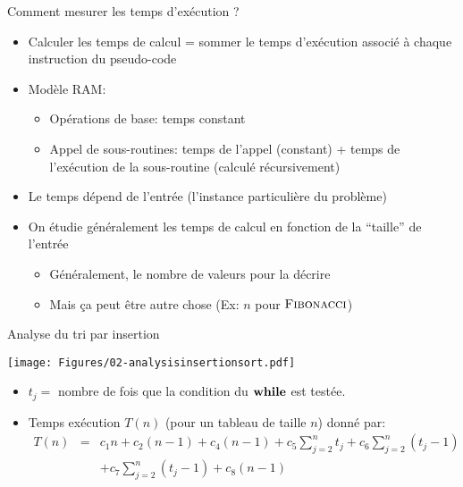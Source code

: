 \begin{frame}{Comment mesurer les temps d'exécution ?}
\begin{itemize}
\item Calculer les temps de calcul = sommer le temps d'exécution associé à chaque instruction du pseudo-code
\item Modèle RAM:
\begin{itemize}
\item Opérations de base: temps constant
\item Appel de sous-routines: temps de l'appel (constant) + temps de l'exécution de la sous-routine (calculé récursivement)
\end{itemize}

\bigskip

\item Le temps dépend de l'entrée (l'instance particulière du problème)
\item On étudie généralement les temps de calcul en fonction de la \alert{``taille''} de l'entrée
\begin{itemize}
\item Généralement, le nombre de valeurs pour la décrire
\item Mais ça peut être autre chose (Ex: $n$ pour $\textnormal{\scshape Fibonacci}$)
\end{itemize}
\end{itemize}
\end{frame}

\begin{frame}{Analyse du tri par insertion}
\centerline{\texttt{[image: Figures/02-analysisinsertionsort.pdf]}}
\begin{itemize}
\item $t_j=$ nombre de fois que la condition du $\textbf{while}$ est testée.
\item Temps exécution $T(n)$ (pour un tableau de taille $n$) donné par:
{\footnotesize
\begin{eqnarray*}
T(n)&=&c_1 n +c_2(n-1)+c_4(n-1)+c_5\sum_{j=2}^n t_j + c_6 \sum_{j=2}^n (t_j-1)\\
&&+c_7\sum_{j=2}^n (t_j-1)+c_8(n-1)
\end{eqnarray*}}
\end{itemize}
\end{frame}

